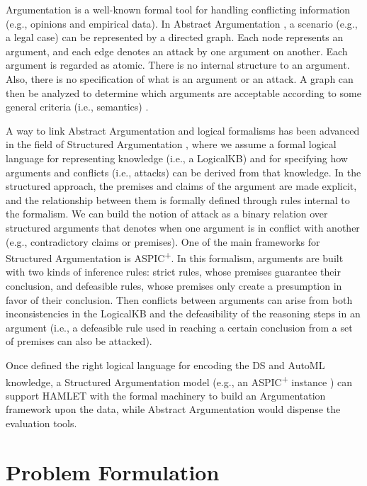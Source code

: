Argumentation is a well-known formal tool for handling conflicting information (e.g., opinions and empirical data).
In Abstract Argumentation \cite{Dung1995abstractArg}, a scenario (e.g., a legal case) can be represented by a directed graph.
Each node represents an argument, and each edge denotes an attack by one argument on another. Each argument is regarded as atomic. There is no internal structure to an argument. Also, there is no specification of what is an argument or an attack. A graph can then be analyzed to determine which arguments are acceptable according to some general criteria (i.e., semantics) \cite{baroniCG11semantics}.

A way to link Abstract Argumentation and logical formalisms has been advanced in the field of Structured Argumentation \cite{BesnardGHMPST14structured}, where we assume a formal logical language for representing knowledge (i.e., a LogicalKB) and for specifying how arguments and conflicts (i.e., attacks) can be derived from that knowledge. 
In the structured approach, the premises and claims of the argument are made explicit, and the relationship between them is formally defined through rules internal to the formalism.
We can build the notion of attack as a binary relation over structured arguments that denotes when one argument is in conflict with another (e.g., contradictory claims or premises).
One of the main frameworks for Structured Argumentation is ASPIC\textsuperscript{+}\cite{Modgil2014aspic+}. 
In this formalism, arguments are built with two kinds of inference rules: strict rules, whose premises guarantee their conclusion, and defeasible rules, whose premises only create a presumption in favor of their conclusion. 
Then conflicts between arguments can arise from both inconsistencies in the LogicalKB and the defeasibility of the reasoning steps in an argument (i.e., a defeasible rule used in reaching a certain conclusion from a set of premises can also be attacked).

Once defined the right logical language for encoding the DS and AutoML knowledge, a Structured Argumentation model (e.g., an ASPIC\textsuperscript{+} instance \cite{arg2p-jlc}) can support HAMLET with the formal machinery to build an Argumentation framework upon the data, while Abstract Argumentation would dispense the evaluation tools.

\section{Problem Formulation}\label{hamlet-sec:problem}

